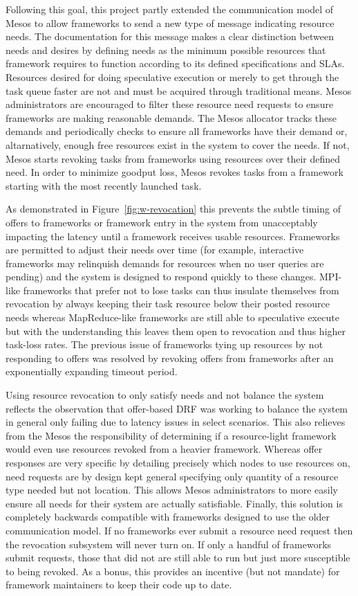 Following this goal, this project partly extended the communication model of Mesos to allow
frameworks to send a new type of message indicating resource needs. The documentation for this
message makes a clear distinction between needs and desires by defining needs as the minimum
possible resources that framework requires to function according to its defined specifications
and SLAs. Resources desired for doing speculative execution or merely to get through the task
queue faster are not and must be acquired through traditional means. Mesos administrators are
encouraged to filter these resource need requests to ensure frameworks are making reasonable
demands. The Mesos allocator tracks these demands and periodically checks to ensure all
frameworks have their demand or, altarnatively, enough free resources exist in the system to
cover the needs. If not, Mesos starts revoking tasks from frameworks using resources over their
defined need. In order to minimize goodput loss, Mesos revokes tasks from a framework starting
with the most recently launched task.

As demonstrated in Figure~\ref{fig:w-revocation} this prevents the subtle timing of offers to
frameworks or framework entry in the system from unacceptably impacting the latency until a
framework receives usable resources. Frameworks are permitted to adjust their needs over time
(for example, interactive frameworks may relinquish demands for resources when no user queries
are pending) and the system is designed to respond quickly to these changes. MPI-like
frameworks that prefer not to lose tasks can thus insulate themselves from revocation by always
keeping their task resource below their posted resource needs whereas MapReduce-like frameworks
are still able to speculative execute but with the understanding this leaves them open to
revocation and thus higher task-loss rates. The previous issue of frameworks tying up resources
by not responding to offers was resolved by revoking offers from frameworks after an
exponentially expanding timeout period.

Using resource revocation to only satisfy needs and not balance the system reflects the
observation that offer-based DRF was working to balance the system in general only failing due
to latency issues in select scenarios. This also relieves from the Mesos the responsibility of
determining if a resource-light framework would even use resources revoked from a heavier
framework. Whereas offer responses are very specific by detailing precisely which nodes to use
resources on, need requests are by design kept general specifying only quantity of a resource
type needed but not location. This allows Mesos administrators to more easily ensure all needs
for their system are actually satisfiable. Finally, this solution is completely backwards
compatible with frameworks designed to use the older communication model. If no frameworks ever
submit a resource need request then the revocation subsystem will never turn on. If only a
handful of frameworks submit requests, those that did not are still able to run but just more
susceptible to being revoked. As a bonus, this provides an incentive (but not mandate) for
framework maintainers to keep their code up to date.

